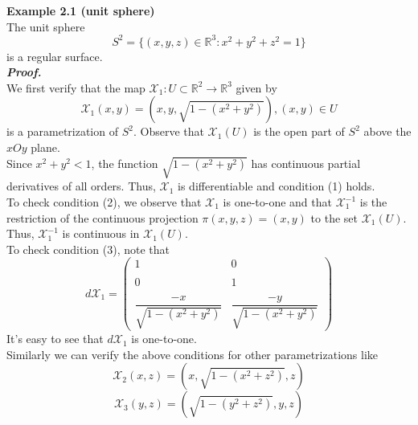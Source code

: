 \documentclass{article}
\begin{document}
\par
\textbf{Example 2.1 (unit sphere)}\\
The unit sphere
$$
    S^2 = \{(x,y,z) \in \mathbb{R}^3: x^2+y^2+z^2=1\}
$$
is a regular surface.\\
\textbf{\textit{Proof.}}\\
We first verify that the map $\mathcal{X}_1: U \subset \mathbb{R}^2 \to \mathbb{R}^3$ given by
$$
    \mathcal{X}_1(x,y) = (x, y, \sqrt{1-(x^2+y^2)}), (x,y) \in U
$$
is a parametrization of $S^2$. Observe that $\mathcal{X}_1(U)$ is the open part of $S^2$ above
the $xOy$ plane.\\
Since $x^2+y^2<1$, the function $\sqrt{1-(x^2+y^2)}$ has continuous partial derivatives of all orders.
Thus, $\mathcal{X}_1$ is differentiable and condition (1) holds.\\
To check condition (2), we observe that $\mathcal{X}_1$ is one-to-one and that $\mathcal{X}_1^{-1}$ is
the restriction of the continuous projection $\pi(x,y,z) = (x,y)$ to the set $\mathcal{X}_1(U)$. Thus,
$\mathcal{X}_1^{-1}$ is continuous in $\mathcal{X}_1(U)$.\\
To check condition (3), note that
$$
    d{\mathcal{X}_{1}} = 
    \left(\begin{array}{cc} 
        1 & 0 \\\\
        0 & 1 \\\\
        \dfrac{-x}{\sqrt{1-(x^2+y^2)}} & \dfrac{-y}{\sqrt{1-(x^2+y^2)}}
    \end{array}\right)
$$
It's easy to see that $d\mathcal{X}_1$ is one-to-one.\\
Similarly we can verify the above conditions for other parametrizations like
$$
    \mathcal{X}_2(x,z) = (x, \sqrt{1-(x^2+z^2)}, z)
$$
$$
    \mathcal{X}_3(y,z) = (\sqrt{1-(y^2+z^2)}, y, z)
$$
\end{document}
